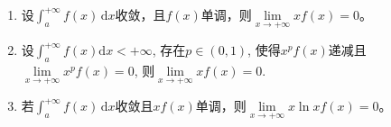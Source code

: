 \documentclass[../../main.tex]{subfiles}%
\begin{document}
\begin{proposition}\label{proposition:反常积分收敛的基本结论1}
\begin{enumerate}[(1)]
\item 设\(\int_a^{+\infty}{f(x)\,\mathrm{d}x}\)收敛，且\(f(x)\)单调，则\(\lim\limits_{x\rightarrow+\infty}xf(x)=0\)。

\item 设$\int_a^{+\infty}{f\left( x \right) \mathrm{d}x}<+\infty$, 存在$p\in \left( 0,1 \right)$, 使得$x^pf\left( x \right)$递减且$\lim\limits_{x\rightarrow +\infty}{x^pf\left( x \right)} =0$, 则$\lim\limits_{x\rightarrow +\infty}{xf\left( x \right)} =0$.

\item 若\(\int_a^{+\infty} f(x)\,\mathrm{d}x\)收敛且\(xf(x)\)单调，则\(\lim\limits_{x \to +\infty}x\ln x f(x)=0\)。
\end{enumerate}
\end{proposition}
\end{document}
